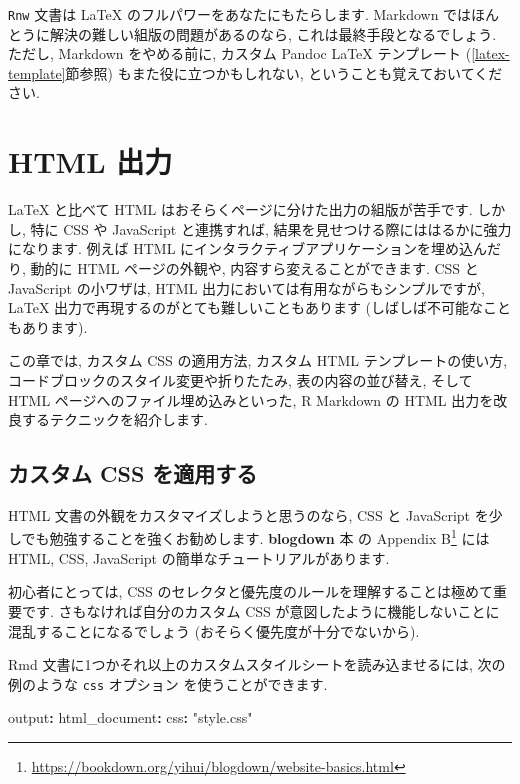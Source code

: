 \documentclass[
  11pt,
  lualatex,
  ja=standard]{bxjsreport}
\newenvironment{Shaded}{\begin{snugshade}}{\end{snugshade}}
\newcommand{\AttributeTok}[1]{\textcolor[rgb]{0.77,0.63,0.00}{#1}}
\newcommand{\FunctionTok}[1]{\textcolor[rgb]{0.00,0.00,0.00}{#1}}
\newcommand{\KeywordTok}[1]{\textcolor[rgb]{0.13,0.29,0.53}{\textbf{#1}}}
\newcommand{\StringTok}[1]{\textcolor[rgb]{0.31,0.60,0.02}{#1}}
\renewcommand{\href}[2]{#2\footnote{\url{#1}}}
\begin{document}
\texttt{Rnw} 文書は LaTeX のフルパワーをあなたにもたらします. Markdown ではほんとうに解決の難しい組版の問題があるのなら, これは最終手段となるでしょう. ただし, Markdown をやめる前に, カスタム Pandoc LaTeX テンプレート (\ref{latex-template}節参照) もまた役に立つかもしれない, ということも覚えておいてください.

\hypertarget{html-output}{%
\chapter{HTML 出力}\label{html-output}}

LaTeX と比べて HTML はおそらくページに分けた出力の組版が苦手です. しかし, 特に CSS や JavaScript と連携すれば, 結果を見せつける際にははるかに強力になります. 例えば HTML にインタラクティブアプリケーションを埋め込んだり, 動的に HTML ページの外観や, 内容すら変えることができます. CSS と JavaScript の小ワザは, HTML 出力においては有用ながらもシンプルですが, LaTeX 出力で再現するのがとても難しいこともあります (しばしば不可能なこともあります).

この章では, カスタム CSS の適用方法, カスタム HTML テンプレートの使い方, コードブロックのスタイル変更や折りたたみ, 表の内容の並び替え, そして HTML ページへのファイル埋め込みといった, R Markdown の HTML 出力を改良するテクニックを紹介します.

\hypertarget{html-css}{%
\section{カスタム CSS を適用する}\label{html-css}}

HTML 文書の外観をカスタマイズしようと思うのなら, CSS と JavaScript を少しでも勉強することを強くお勧めします. \textbf{blogdown} 本 \autocite{blogdown2017} の \href{https://bookdown.org/yihui/blogdown/website-basics.html}{Appendix B} には HTML, CSS, JavaScript の簡単なチュートリアルがあります.

初心者にとっては, CSS のセレクタと優先度のルールを理解することは極めて重要です. さもなければ自分のカスタム CSS が意図したように機能しないことに混乱することになるでしょう (おそらく優先度が十分でないから).

Rmd 文書に1つかそれ以上のカスタムスタイルシートを読み込ませるには, 次の例のような \texttt{css} オプション を使うことができます.

\begin{Shaded}
\begin{Highlighting}[]
\FunctionTok{output}\KeywordTok{:}
\AttributeTok{  }\FunctionTok{html\_document}\KeywordTok{:}
\AttributeTok{    }\FunctionTok{css}\KeywordTok{:}\AttributeTok{ }\StringTok{"style.css"}
\end{Highlighting}
\end{Shaded}
\end{document}
